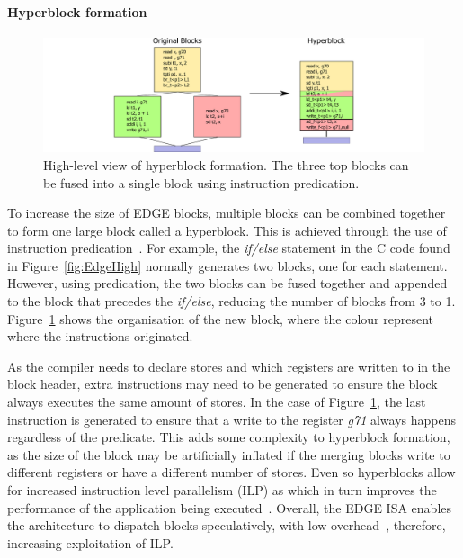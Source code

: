 \paragraph*{Hyperblock formation}
\begin{figure}[t]
    \centering
    \includegraphics[width=1\textwidth]{background/graphics/hyperblock.pdf}
    \caption{High-level view of hyperblock formation. The three top blocks can be fused into a single block using instruction predication.}
    \label{fig:EdgeHB}
	\vspace{-1em}
\end{figure}
To increase the size of EDGE blocks, multiple blocks can be combined together to form one large block called a hyperblock.
This is achieved through the use of instruction predication~\cite{smith2006edge}.
For example, the \textit{if/else} statement in the C code found in Figure~\ref{fig:EdgeHigh} normally generates two blocks, one for each statement.
However, using predication, the two blocks can be fused together and appended to the block that precedes the \textit{if/else}, reducing the number of blocks from 3 to 1.
Figure~\ref{fig:EdgeHB} shows the organisation of the new block, where the colour represent where the instructions originated.

As the compiler needs to declare stores and which registers are written to in the block header, extra instructions may need to be generated to ensure the block always executes the same amount of stores.
In the case of Figure~\ref{fig:EdgeHB}, the last instruction is generated to ensure that a write to the register \textit{g71} always happens regardless of the predicate.
This adds some complexity to hyperblock formation, as the size of the block may be artificially inflated if the merging blocks write to different registers or have a different number of stores.
Even so hyperblocks allow for increased instruction level parallelism (ILP) as  which in turn improves the performance of the application being executed~\cite{smith2006edge}.
Overall, the EDGE ISA enables the architecture to dispatch blocks speculatively, with low overhead~\cite{putnam2010e2,kim2007tflex}, therefore, increasing exploitation of ILP.

